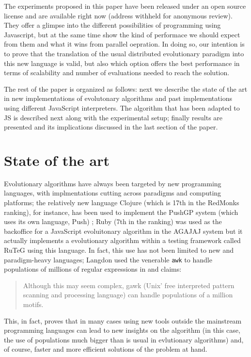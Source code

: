 \documentclass{sig-alternate}
\begin{document}
The experiments proposed in this paper have been released under an
open source license and are available right now (address withheld for
anonymous review). They offer a glimpse into the different
possibilities of programming using Javascript, but at the same time
show the kind of performace we should expect from them and what it
wins from parallel oepration. In doing so, our intention is to prove
that the translation of the usual distributed evolutionary paradigm
into this new language is valid, but also which option offers the best
performance in terms of scalability and number of evaluations needed
to reach the solution.

The rest of the paper is organized as follows: next we describe the
state of the art in new implementations of evolutonary algorithms and
past implementations using different JavaScript interpreters. The
algorithm that has been adapted to JS is described next along with the
experimental setup; finally results are presented and its implications
discussed in the last section of the paper. 

\section{State of the art}
\label{sec:soa}

Evolutionary algorithms have always been targeted by new programming
languages, with implmentations cutting across paradigms and computing
platforms; the relatively new language Clojure (which is 17th in the
RedMonks ranking), for instance, has been used to implement the PushGP
system (which uses its own language, Push) \cite{helmuth2013evolving};
Ruby (7th in the ranking) was used as the backoffice for a JavaScript
evoluitonary algorithm in the AGAJAJ system \cite{agajaj} but it
actually implements a evolutionary algorithm within a testing
framework called RuTeG \cite{mairhofer2011search} using this
language. In fact, this use has not been limited to new and
paradigm-heavy languages; Langdon used the venerable {\tt awk} to
handle populations of millions of regular expressions in
\cite{langdon2008evolving,langdon2009evolving} and claims:
\begin{quote}
Although this may seem complex, gawk (Unix' free interpreted pattern
scanning and processing language) can handle populations of a million
motifs. 
\end{quote}
This, in fact, proves that in many cases using new tools outside the
mainstream programming languages can lead to new insights on the
algorithm (in this case, the use of populations much bigger than is
usual in evlutionary algorithms) and, of course, faster and more
efficient solutions of the problem at hand. 
\end{document}
